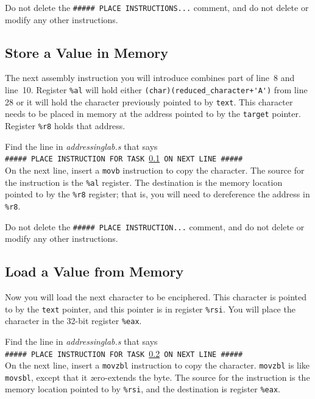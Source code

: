 
Do not delete the \texttt{\#\#\#\#\# PLACE INSTRUCTIONS...} comment, and do not
delete or modify any other instructions.

\subsection{Store a Value in Memory}\label{task4}

The next assembly instruction you will introduce combines part of line~8 and
line~10. Register \lstinline{%al} will hold either
\lstinline{(char)(reduced_character+'A')} from line 28 or it will hold the
character previously pointed to by \lstinline{text}. This character needs to be
placed in memory at the address pointed to by the \lstinline{target} pointer.
Register \lstinline{%r8} holds that address.

Find the line in \textit{addressinglab.s} that says \\
\texttt{\#\#\#\#\# PLACE INSTRUCTION FOR TASK \ref{task4} ON NEXT LINE \#\#\#\#\#} \\
On the next line, insert a \lstinline{movb} instruction to copy the character.
The source for the instruction is the \lstinline{%al} register. The destination
is the memory location pointed to by the \lstinline{%r8} register; that is, you
will need to dereference the address in \lstinline{%r8}.


Do not delete the \texttt{\#\#\#\#\# PLACE INSTRUCTION...} comment, and do not
delete or modify any other instructions.

\subsection{Load a Value from Memory}\label{task5}

Now you will load the next character to be enciphered. This character is
pointed to by the \lstinline{text} pointer, and this pointer is in register
\lstinline{%rsi}. You will place the character in the 32-bit register
\lstinline{%eax}.

Find the line in \textit{addressinglab.s} that says \\
\texttt{\#\#\#\#\# PLACE INSTRUCTION FOR TASK \ref{task5} ON NEXT LINE \#\#\#\#\#} \\
On the next line, insert a \lstinline{movzbl} instruction to copy the
character. \lstinline{movzbl} is like \lstinline{movsbl}, except that it
\textit{z}ero-extends the byte. The source for the instruction is the memory
location pointed to by \lstinline{%rsi}, and the destination is register
\lstinline{%eax}.

